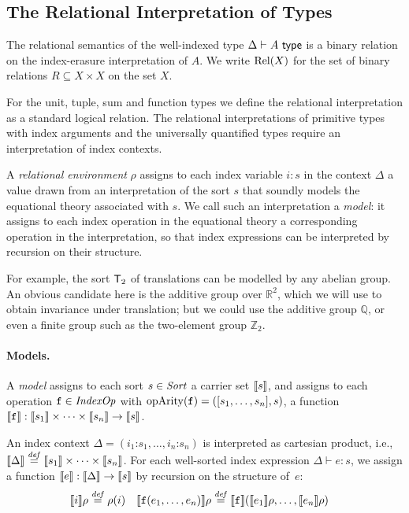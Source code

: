 \subsection{The Relational Interpretation of Types}
\label{sec:relational-semantics}

The relational semantics of the well-indexed type
$\Delta \vdash A \textup{\textsf{ type}}$ is a binary relation on the index-erasure
interpretation of $A$. We write $\mathrm{Rel}(X)$ for the set
of binary relations $R \subseteq X \times X$ on the set $X$.

For the unit, tuple, sum and function types we define the
relational interpretation as a standard logical relation. The
relational interpretations of primitive types with index arguments and
the universally quantified types require an interpretation of index
contexts.

A \emph{relational environment} $\rho$ assigns to each index variable $i:s$
in the context $\Delta$ a value drawn from an interpretation of
the sort $s$ that soundly models the equational theory associated with $s$. We call
such an interpretation a \emph{model}: it assigns to each index operation in the equational 
theory a corresponding operation in the interpretation, so that index expressions 
can be interpreted by recursion on their structure. 

For example, the sort $\mathsf{T}_2$ of translations can be modelled by
any abelian group. An obvious candidate here is the additive group over 
$\mathbb R^2$, which we will use to obtain invariance under translation;
but we could use the additive group $\mathbb Q$, or even a finite group such as the 
two-element group $\mathbb Z_2$. 

\paragraph{Models.}
A \emph{model} 
assigns to each sort $s \in \mathit{Sort}$ a
carrier set $\llbracket s \rrbracket$, and assigns to each operation $\texttt{f}
\in \mathit{IndexOp}$ with $\mathrm{opArity}(\texttt{f}) =
([s_1,\ldots,s_n],s)$, a function $\llbracket \texttt{f} \rrbracket :
\llbracket s_1 \rrbracket\times\cdots\times\llbracket s_n \rrbracket \to \llbracket s \rrbracket$.

An index context $\Delta = (i_1\mathord:s_1,\ldots,i_n\mathord:s_n)$ is
interpreted as cartesian product, i.e., $\llbracket \Delta \rrbracket \stackrel{\mathit{def}}= \llbracket s_1 \rrbracket
\times\cdots \times \llbracket s_n \rrbracket$. 
For each well-sorted index expression $\Delta \vdash
e : s$, we assign a function $\llbracket e \rrbracket : \llbracket \Delta \rrbracket \to
\llbracket s \rrbracket$ by recursion on the structure of~$e$:
\begin{align*}
\llbracket i \rrbracket \rho & \stackrel{\mathit{def}}= \rho(i) &
\llbracket \textup{\texttt{f}}(e_1, \ldots, e_n) \rrbracket \rho & \stackrel{\mathit{def}}= \llbracket \textup{\texttt{f}} \rrbracket(
\llbracket e_1 \rrbracket\rho,\ldots,\llbracket e_n \rrbracket\rho)
\end{align*}

